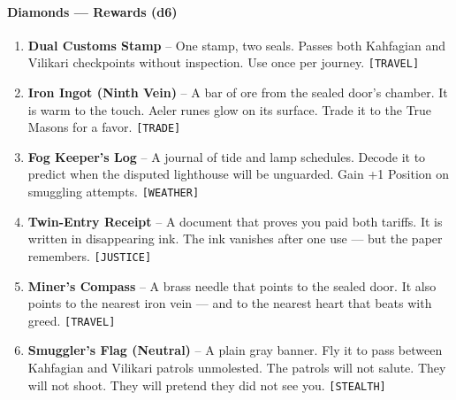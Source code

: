\paragraph{Diamonds --- Rewards (d6)}
\begin{enumerate}
\item \textbf{Dual Customs Stamp} -- One stamp, two seals. Passes both Kahfagian and Vilikari checkpoints without inspection. Use once per journey. \texttt{[TRAVEL]}
\item \textbf{Iron Ingot (Ninth Vein)} -- A bar of ore from the sealed door's chamber. It is warm to the touch. Aeler runes glow on its surface. Trade it to the True Masons for a favor. \texttt{[TRADE]}
\item \textbf{Fog Keeper's Log} -- A journal of tide and lamp schedules. Decode it to predict when the disputed lighthouse will be unguarded. Gain +1 Position on smuggling attempts. \texttt{[WEATHER]}
\item \textbf{Twin-Entry Receipt} -- A document that proves you paid both tariffs. It is written in disappearing ink. The ink vanishes after one use --- but the paper remembers. \texttt{[JUSTICE]}
\item \textbf{Miner's Compass} -- A brass needle that points to the sealed door. It also points to the nearest iron vein --- and to the nearest heart that beats with greed. \texttt{[TRAVEL]}
\item \textbf{Smuggler's Flag (Neutral)} -- A plain gray banner. Fly it to pass between Kahfagian and Vilikari patrols unmolested. The patrols will not salute. They will not shoot. They will pretend they did not see you. \texttt{[STEALTH]}
\end{enumerate}